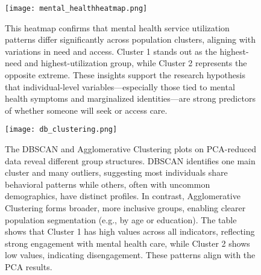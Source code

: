 \documentclass{article}
\begin{document}
    \begin{figure}[H]
        
        \centering
        \begin{adjustbox}{max width=\textwidth}
        \texttt{[image: mental\_healthheatmap.png]}
        \end{adjustbox}

        \caption{This heatmap confirms that mental health service utilization patterns differ significantly across population clusters, aligning with variations in need and access. Cluster 1 stands out as the highest-need and highest-utilization group, while Cluster 2 represents the opposite extreme. These insights support the research hypothesis that individual-level variables—especially those tied to mental health symptoms and marginalized identities—are strong predictors of whether someone will seek or access care.}
        \label{fig:yourlabel}
    \end{figure}
    
    \begin{figure}[H]
    
        \centering
        \begin{adjustbox}{max width=\textwidth}
        \texttt{[image: db\_clustering.png]}
        \end{adjustbox}

        \caption{The DBSCAN and Agglomerative Clustering plots on PCA-reduced data reveal different group structures. DBSCAN identifies one main cluster and many outliers, suggesting most individuals share behavioral patterns while others, often with uncommon demographics, have distinct profiles. In contrast, Agglomerative Clustering forms broader, more inclusive groups, enabling clearer population segmentation (e.g., by age or education). The table shows that Cluster 1 has high values across all indicators, reflecting strong engagement with mental health care, while Cluster 2 shows low values, indicating disengagement. These patterns align with the PCA results.}
    \label{fig:yourlabel}
\end{figure}
\end{document}
